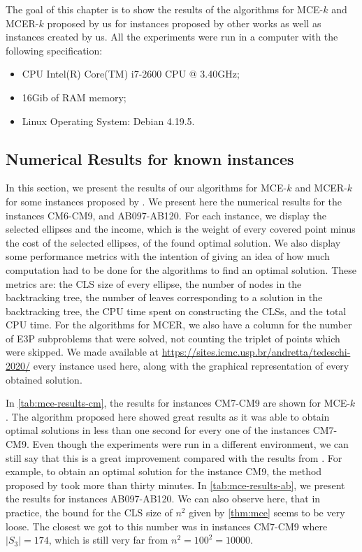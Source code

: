 The goal of this chapter is to show the results of the algorithms for MCE-$k$ and MCER-$k$ proposed by us for instances proposed by other works as well as instances created by us. All the experiments were run in a computer with the following specification:
\begin{itemize}
	\item CPU Intel(R) Core(TM) i7-2600 CPU @ 3.40GHz;
	\item 16Gib of RAM memory;
	\item Linux Operating System: Debian 4.19.5.
\end{itemize}

\subsection{Numerical Results for known instances}

In this section, we present the results of our algorithms for MCE-$k$ and MCER-$k$ 
for some instances proposed by \cite{canbolat, andreta}. 
We present here the numerical results for the instances CM6-CM9, and AB097-AB120. 
For each instance, we display the selected ellipses and the income, which is the weight of every covered point minus the cost of the selected ellipses, of the found optimal solution. 
We also display some performance metrics with the intention of giving an idea of how much computation had to be done for the algorithms to find an optimal solution. These metrics are: 
the CLS size of every ellipse, the number of nodes in the backtracking tree, the number of leaves corresponding to a solution in the backtracking tree, the CPU time spent on constructing the CLSs, and the total CPU time.
For the algorithms for MCER, we also have a column for the number of E3P subproblems that were solved, not counting the triplet of points which were skipped.
We made available at \url{https://sites.icmc.usp.br/andretta/tedeschi-2020/} every instance used here, along with the graphical representation of every obtained solution.

In \autoref{tab:mce-results-cm}, the results for instances CM7-CM9 are shown for MCE-$k$. 
The algorithm proposed here showed great results as it was able to obtain optimal solutions in less than one second for every one of the instances CM7-CM9.
Even though the experiments were run in a different environment, we can still say that this is a great improvement compared with the results from \cite{andreta}. For example, to obtain an optimal solution for the instance CM9, the method proposed by \cite{andreta} took more than thirty minutes.
In \autoref{tab:mce-results-ab}, we present the results for instances AB097-AB120.
We can also observe here, that in practice, the bound for the CLS size of $n^2$ given by \autoref{thm:mce} seems to be very loose. The closest we got to this number was in instances CM7-CM9 where $|S_3|=174$, which is still very far from $n^2=100^2=\num{10000}$.

